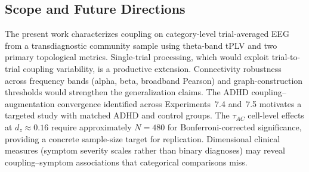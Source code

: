 \subsection{Scope and Future Directions}

The present work characterizes coupling on category-level trial-averaged EEG from a transdiagnostic community sample using theta-band tPLV and two primary topological metrics. Single-trial processing, which would exploit trial-to-trial coupling variability, is a productive extension. Connectivity robustness across frequency bands (alpha, beta, broadband Pearson) and graph-construction thresholds would strengthen the generalization claims. The ADHD coupling--augmentation convergence identified across Experiments~7.4 and~7.5 motivates a targeted study with matched ADHD and control groups. The $\tau_{AC}$ cell-level effects at $d_z \approx 0.16$ require approximately $N = 480$ for Bonferroni-corrected significance, providing a concrete sample-size target for replication. Dimensional clinical measures (symptom severity scales rather than binary diagnoses) may reveal coupling--symptom associations that categorical comparisons miss.

